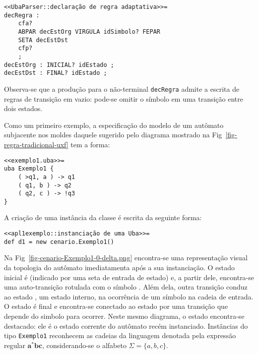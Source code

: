 \begin{lstlisting}[style=antlr]
<<UbaParser::declaração de regra adaptativa>>=
decRegra :
	cfa?
	ABPAR decEstOrg VIRGULA idSimbolo? FEPAR
	SETA decEstDst
	cfp?
	;
decEstOrg : INICIAL? idEstado ;
decEstDst : FINAL? idEstado ;
\end{lstlisting}

\noindent
Observa-se que a produção para o não-terminal \lstinline[style=antlr]!decRegra! admite a escrita de regras de transição em vazio: pode-se omitir o símbolo em uma transição entre dois estados.

Como um primeiro exemplo, a especificação do modelo de um autômato subjacente nos moldes daquele sugerido pelo diagrama mostrado na Fig~\ref{fig-regra-tradicional-uxf} tem a forma:

\begin{lstlisting}
<<exemplo1.uba>>=
uba Exemplo1 {
	( >q1, a ) -> q1
	( q1, b ) -> q2
	( q2, c ) -> !q3
}
\end{lstlisting}

\noindent
A criação de uma instância  da classe  é escrita da seguinte forma:

\begin{lstlisting}
<<apl1exemplo::instanciação de uma Uba>>=
def d1 = new cenario.Exemplo1()
\end{lstlisting}

\noindent
Na Fig~\ref{fig-cenario-Exemplo1-0-delta.png} encontra-se uma representação visual da topologia do autômato imediatamenta após a sua instanciação. O estado inicial é  (indicado por uma seta de entrada de estado) e, a partir dele, encontra-se uma auto-transição rotulada com o símbolo . Além dela, outra transição conduz ao estado , um estado interno, na ocorrência de um símbolo  na cadeia de entrada. O estado  é final e encontra-se conectado ao estado  por uma transição que depende do simbolo  para ocorrer. Neste mesmo diagrama, o estado  encontra-se destacado: ele é o estado corrente do autômato recém instanciado. Instâncias do tipo \lstinline!Exemplo1! reconhecem as cadeias da linguagem denotada pela expressão regular $\mathbf{a^*bc}$, considerando-se o alfabeto $\Sigma=\{a, b, c\}$.


